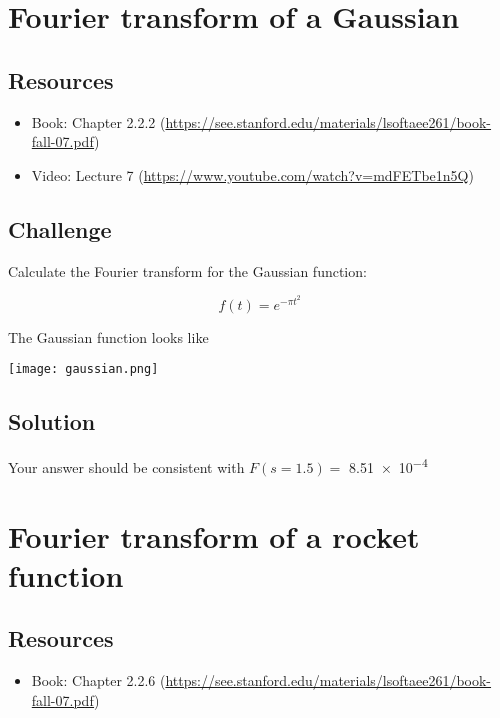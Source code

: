 \newpage
\section{Fourier transform of a Gaussian}

\subsection*{Resources}
\begin{itemize}
    \item Book: Chapter 2.2.2 (\url{https://see.stanford.edu/materials/lsoftaee261/book-fall-07.pdf})
    \item Video: Lecture 7 (\url{https://www.youtube.com/watch?v=mdFETbe1n5Q})
\end{itemize}

\subsection*{Challenge}
Calculate the Fourier transform for the Gaussian function:

\begin{equation}
    f(t) = e^{-\pi t^2}
\end{equation}

The Gaussian function looks like

\texttt{[image: gaussian.png]}

\subsection*{Solution}
Your answer should be consistent with $F(s=1.5) =$ \num{8.51e-4}




\newpage
\section{Fourier transform of a rocket function}

\subsection*{Resources}
\begin{itemize}
    \item Book: Chapter 2.2.6 (\url{https://see.stanford.edu/materials/lsoftaee261/book-fall-07.pdf})
\end{itemize}

